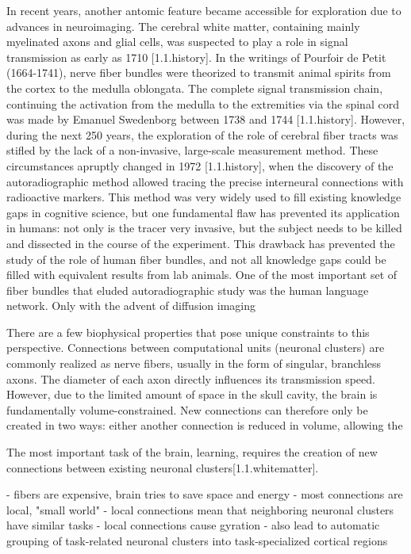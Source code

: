 In recent years, another antomic feature became accessible for exploration due to advances in neuroimaging.
The cerebral white matter, containing mainly myelinated axons and glial cells, was suspected to play a role in signal transmission as early as 1710 [1.1.history].
In the writings of Pourfoir de Petit (1664-1741), nerve fiber bundles were theorized to transmit animal spirits from the cortex to the medulla oblongata.
The complete signal transmission chain, continuing the activation from the medulla to the extremities via the spinal cord was made by Emanuel Swedenborg between 1738 and 1744 [1.1.history].
However, during the next 250 years, the exploration of the role of cerebral fiber tracts was stifled by the lack of a non-invasive, large-scale measurement method.
These circumstances apruptly changed in 1972 [1.1.history], when the discovery of the autoradiographic method allowed tracing the precise interneural connections with radioactive markers.
This method was very widely used to fill existing knowledge gaps in cognitive science, but one fundamental flaw has prevented its application in humans: not only is the tracer very invasive, but the subject needs to be killed and dissected in the course of the experiment.
This drawback has prevented the study of the role of human fiber bundles, and not all knowledge gaps could be filled with equivalent results from lab animals.
One of the most important set of fiber bundles that eluded autoradiographic study was the human language network.
Only with the advent of diffusion imaging


There are a few biophysical properties that pose unique constraints to this perspective.
Connections between computational units (neuronal clusters) are commonly realized as nerve fibers, usually in the form of singular, branchless axons.
The diameter of each axon directly influences its transmission speed.
However, due to the limited amount of space in the skull cavity, the brain is fundamentally volume-constrained.
New connections can therefore only be created in two ways: either another connection is reduced in volume, allowing the 

The most important task of the brain, learning, requires the creation of new connections between existing neuronal clusters[1.1.whitematter].

- fibers are expensive, brain tries to save space and energy
- most connections are local, "small world"
- local connections mean that neighboring neuronal clusters have similar tasks
- local connections cause gyration
- also lead to automatic grouping of task-related neuronal clusters into task-specialized cortical regions

